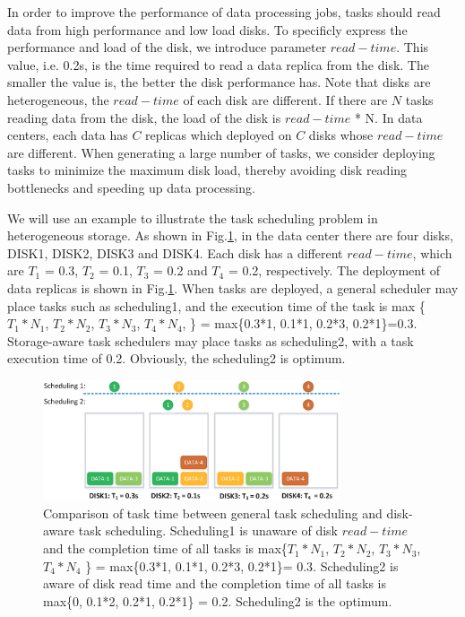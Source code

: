 \documentclass[conference]{IEEEtran}
\begin{document}
In order to improve the performance of data processing jobs, tasks should read data from high performance and low load disks. To specificly express the performance and load of the disk, we introduce parameter $read-time$. This value, i.e. 0.2s, is the time required to read a data replica from the disk. The smaller the value is, the better the disk performance has. Note that disks are heterogeneous, the $read-time$ of each disk are different. If there are $N$ tasks reading data from the disk, the load of the disk is $read-time$ * N. In data centers, each data has $C$ replicas which deployed on $C$ disks whose $read-time$ are different. When generating a large number of tasks, we consider deploying tasks to minimize the maximum disk load, thereby avoiding disk reading bottlenecks and speeding up data processing.%



We will use an example to illustrate the task scheduling problem in heterogeneous storage. As shown in Fig.\ref{fig1}, in the data center there are four disks, DISK1, DISK2, DISK3 and DISK4. Each disk has a different $read-time$, which are $T_1$ = 0.3, $T_2$ = 0.1, $T_3$ = 0.2 and $T_4$ = 0.2, respectively. The deployment of data replicas is shown in Fig.\ref{fig1}. When tasks are deployed, a general scheduler may place tasks such as scheduling1, and the execution time of the task is max \{$T_1 * N_1$, $T_2 * N_2$, $T_3 * N_3$,  $T_4 * N_4$, \} = max\{0.3*1, 0.1*1, 0.2*3, 0.2*1\}=0.3. Storage-aware task schedulers may place tasks as scheduling2, with a task execution time of 0.2. Obviously, the scheduling2 is optimum.

\begin{figure}[!t]
	\centering
	\includegraphics[height=1.4in]{fig1.eps}
	\caption{Comparison of task time between general task scheduling and disk-aware task scheduling. Scheduling1 is unaware of disk $read-time$ and the completion time of all tasks is max\{$T_1 * N_1$, $T_2 * N_2$, $T_3 * N_3$,  $T_4 * N_4$ \} = max\{0.3*1, 0.1*1, 0.2*3, 0.2*1\}= 0.3. Scheduling2 is aware of disk read time and the completion time of all tasks is max\{0, 0.1*2, 0.2*1, 0.2*1\} = 0.2. Scheduling2 is the optimum. }
	\label{fig1}
\end{figure}
\end{document}
